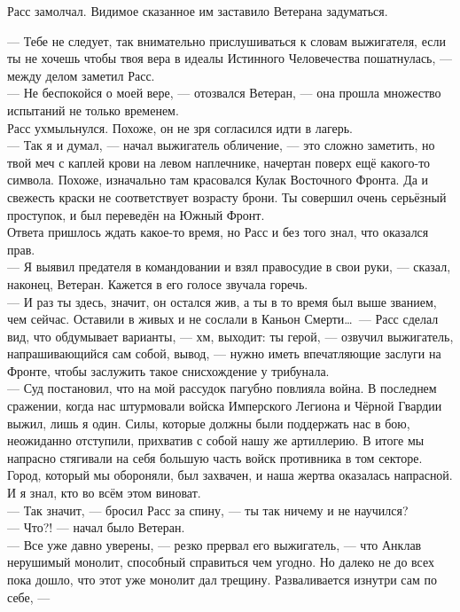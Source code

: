 Расс замолчал. Видимое сказанное им заставило Ветерана задуматься.

\noindent--- Тебе не следует, так внимательно прислушиваться к словам 
выжигателя, если ты не хочешь чтобы твоя вера в идеалы Истинного Человечества 
пошатнулась, --- между делом заметил Расс.\\
--- Не беспокойся о моей вере, --- отозвался Ветеран, --- она прошла множество 
испытаний не только временем.\\
Расс ухмыльнулся. Похоже, он не зря согласился идти в лагерь.\\
--- Так я и думал, --- начал выжигатель обличение, --- это сложно заметить, но 
твой меч с каплей крови на левом наплечнике, начертан поверх ещё какого-то 
символа. Похоже, изначально там красовался Кулак Восточного Фронта. Да и 
свежесть краски не соответствует возрасту брони. Ты совершил очень серьёзный 
проступок, и был переведён на Южный Фронт.\\
Ответа пришлось ждать какое-то время, но Расс и без того знал, что оказался 
прав.\\
--- Я выявил предателя в командовании и взял правосудие в свои руки, --- 
сказал, наконец, Ветеран. Кажется в его голосе звучала горечь.\\
--- И раз ты здесь, значит, он остался жив, а ты в то время был выше званием, 
чем сейчас. Оставили в живых и не сослали в Каньон Смерти\ldots\ --- Расс 
сделал вид, что обдумывает варианты, --- хм, выходит: ты герой, --- озвучил 
выжигатель, напрашивающийся сам собой, вывод, --- нужно иметь впечатляющие 
заслуги на Фронте, чтобы заслужить такое снисхождение у трибунала.\\
--- Суд постановил, что на мой рассудок пагубно повлияла война. В последнем 
сражении, когда нас штурмовали войска Имперского Легиона и Чёрной Гвардии выжил, 
лишь я один. Силы, которые должны были поддержать нас в бою, неожиданно 
отступили, прихватив с собой нашу же артиллерию. В итоге мы напрасно стягивали 
на себя большую часть войск противника в том секторе. Город, который мы 
обороняли, был захвачен, и наша жертва оказалась напрасной. И я знал, кто во 
всём этом виноват.\\
--- Так значит, --- бросил Расс за спину, --- ты так ничему и не научился?\\
--- Что?! --- начал было Ветеран.\\
--- Все уже давно уверены, --- резко прервал его выжигатель, --- что Анклав 
нерушимый монолит, способный справиться чем угодно. Но далеко не до всех пока 
дошло, что этот уже монолит дал трещину. Разваливается изнутри сам по себе, --- 
